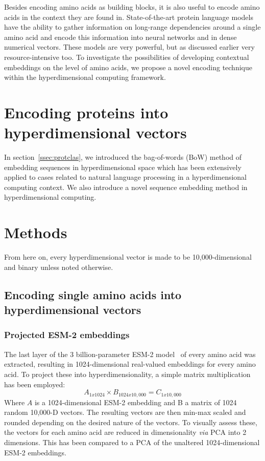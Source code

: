 Besides encoding amino acids as building blocks, it is also useful to encode amino acids in the context they are found in. State-of-the-art protein language models have the ability to gather information on long-range dependencies around a single amino acid and encode this information into neural networks and in dense numerical vectors. These models are very powerful, but as discussed earlier very resource-intensive too. To investigate the possibilities of developing contextual embeddings on the level of amino acids, we propose a novel encoding technique within the hyperdimensional computing framework.

\section{Encoding proteins into hyperdimensional vectors}
In section~\ref{ssec:protclas}, we introduced the bag-of-words (BoW) method of embedding sequences in hyperdimensional space which has been extensively applied to cases related to natural language processing in a hyperdimensional computing context. We also introduce a novel sequence embedding method in hyperdimensional computing.

\section{Methods}
From here on, every hyperdimensional vector is made to be 10,000-dimensional and binary unless noted otherwise. 
\subsection*{Encoding single amino acids into hyperdimensional vectors}
\subsubsection*{Projected ESM-2 embeddings}
The last layer of the 3 billion-parameter ESM-2 model~\cite{esm2} of every amino acid was extracted, resulting in 1024-dimensional real-valued embeddings for every amino acid. To project these into hyperdimensionality, a simple matrix multiplication has been employed: 
\[A_{1x1024} \times B_{1024x10,000} = C_{1x10,000}\]
Where $A$ is a 1024-dimensional ESM-2 embedding and B a matrix of 1024 random 10,000-D vectors. The resulting vectors are then min-max scaled and rounded depending on the desired nature of the vectors. To visually assess these, the vectors for each amino acid are reduced in dimensionality \textit{via} PCA into 2 dimensions. This has been compared to a PCA of the unaltered 1024-dimensional ESM-2 embeddings.
